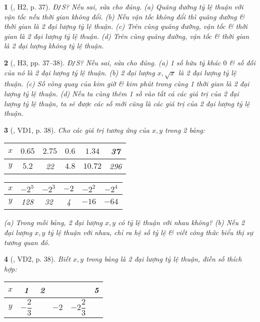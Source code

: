 \documentclass{article}
\newtheorem{baitoan}{}
\begin{document}
\begin{baitoan}[\cite{Binh_boi_duong_Toan_7_tap_1}, H2, p. 37]
	{\rm Đ{\tt/}S?} Nếu sai, sửa cho đúng. (a) Quãng đường tỷ lệ thuận với vận tốc nếu thời gian không đổi. (b) Nếu vận tốc không đổi thì quãng đường \& thời gian là 2 đại lượng tỷ lệ thuận. (c) Trên cùng quãng đường, vận tốc \& thời gian là 2 đại lượng tỷ lệ thuận. (d) Trên cùng quãng đường, vận tốc \& thời gian là 2 đại lượng không tỷ lệ thuận.
\end{baitoan}

\begin{baitoan}[\cite{Binh_boi_duong_Toan_7_tap_1}, H3, pp. 37--38]
	{\rm Đ{\tt/}S?} Nếu sai, sửa cho đúng. (a) 1 số hữu tỷ khác $0$ \& số đối của nó là 2 đại lượng tỷ lệ thuận. (b) 2 đại lượng $x,\sqrt{x}$ là 2 đại lượng tỷ lệ thuận. (c) Số vòng quay của kim giờ \& kim phút trong cùng 1 thời gian là 2 đại lượng tỷ lệ thuận. (d) Nếu ta cùng thêm 1 số vào tất cả các giá trị của 2 đại lượng tỷ lệ thuận, ta sẽ được các số mới cũng là các giá trị của 2 đại lượng tỷ lệ thuận.
\end{baitoan}

\begin{baitoan}[\cite{Binh_boi_duong_Toan_7_tap_1}, VD1, p. 38]
	Cho các giá trị tương ứng của $x,y$ trong 2 bảng:
	\begin{table}[H]
		\centering
		\begin{tabular}{|c|c|c|c|c|c|}
			\hline
			$x$ & $0.65$ & $2.75$ & $0.6$ & $1.34$ & 37 \\
			\hline
			$y$ & $5.2$ & 22 & $4.8$ & $10.72$ & 296 \\
			\hline
		\end{tabular}\hspace{1cm}
		\begin{tabular}{|c|c|c|c|c|c|}
			\hline
			$x$ & $-2^5$ & $-2^3$ & $-2$ & $-2^2$ & $-2^4$ \\
			\hline
			$y$ & 128 & 32 & 4 & $-16$ & $-64$ \\
			\hline
		\end{tabular}
	\end{table}
	\noindent(a) Trong mỗi bảng, 2 đại lượng $x,y$ có tỷ lệ thuận với nhau không? (b) Nếu 2 đại lượng $x,y$ tỷ lệ thuận với nhau, chỉ ra hệ số tỷ lệ \& viết công thức biểu thị sự tương quan đó.
\end{baitoan}

\begin{baitoan}[\cite{Binh_boi_duong_Toan_7_tap_1}, VD2, p. 38]
	Biết $x,y$ trong bảng là 2 đại lượng tỷ lệ thuận, điền số thích hợp:
	\begin{table}[H]
		\centering
		\begin{tabular}{|c|c|c|c|c|c|}
			\hline
			$x$ & 1 & 2 & & & 5 \\
			\hline
			$y$ & $-\dfrac{2}{3}$ & & $-2$ & $-2\dfrac{2}{3}$ & \\
			\hline
		\end{tabular}
	\end{table}
\end{baitoan}
\end{document}
